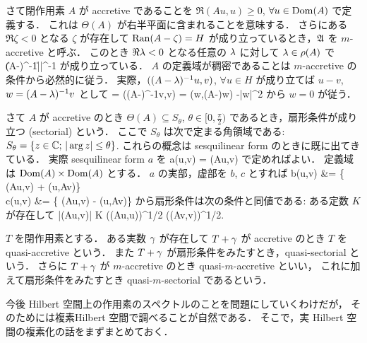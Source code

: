 さて閉作用素 $A$ が accretive であることを
$\Re (Au,u)\ge 0$, $\forall u\in\operatorname{Dom}\nolimits(A)$
で定義する．
これは $\Theta(A)$ が右半平面に含まれることを意味する．
さらにある $\Re \zeta<0$ となる $\zeta$ が存在して $\operatorname{Ran}\nolimits(A-\zeta)=H$
が成り立っているとき，${\mathfrak A}$ を $m$-accretive と呼ぶ．
このとき $\Re \lambda<0$ となる任意の $\lambda$ に対して $\lambda\in\rho(A)$ で
\bdm %
\|(A-\lm)^{-1}\| \le |\Re \lm|^{-1}
\edm %
が成り立っている．
$A$ の定義域が稠密であることは $m$-accretive の条件から必然的に従う．
実際，$((A-\lambda)^{-1}u,v)$, $\forall u\in H$ が成り立てば
$u-v$, $w=(A-\lambda)^{-1}v$ として
= \Re((A-\lm)^{-1}v,v)
= \Re(w,(A-\lm)w)
\ge -\Re\lm |w|^2
\edm %
から $w=0$ が従う．

さて $A$ が accretive のとき
$\Theta(A) \subseteq S_\theta$, $\theta\in[0,\frac{\pi}{2})$
であるとき，扇形条件が成り立つ (sectorial) という．
ここで $S_\theta$ は次で定まる角領域である:
$S_\theta = \{z\in{\mathbb C};\, |\arg z| \le \theta \}$.
これらの概念は sesquilinear form のときに既に出てきている．
実際 sesquilinear form $a$ を
\bdn %
a(u,v)
= (Au,v)
\edn %
で定めればよい．
定義域は $\operatorname{Dom}\nolimits(A)\times \operatorname{Dom}\nolimits(A)$ とする．
$a$ の実部，虚部を $b$, $c$ とすれば
\bdmn %
b(u,v)
&= \{ (Au,v) + (u,Av)\}
 \\
c(u,v)
&= \{ (Au,v) - (u,Av)\}
\edmn %
 から扇形条件は次の条件と同値である:
ある定数 $K$ が存在して
\bdn %
|(Au,v)|
\le K (\Re(Au,u))^{1/2} (\Re(Av,v))^{1/2}.
\edn %

$T$ を閉作用素とする．
ある実数 $\gamma$ が存在して $T+\gamma$ が accretive のとき
 $T$ を quasi-accretive という．
また $T+\gamma$ が扇形条件をみたすとき，quasi-sectorial という．
さらに $T+\gamma$ が $m$-accretive のとき quasi-$m$-accretive といい，
これに加えて扇形条件をみたすとき quasi-$m$-sectorial であるという．


\bigskip
今後 Hilbert 空間上の作用素のスペクトルのことを問題にしていくわけだが，
そのためには複素Hilbert 空間で調べることが自然である．
そこで，実 Hilbert 空間の複素化の話をまずまとめておく．

